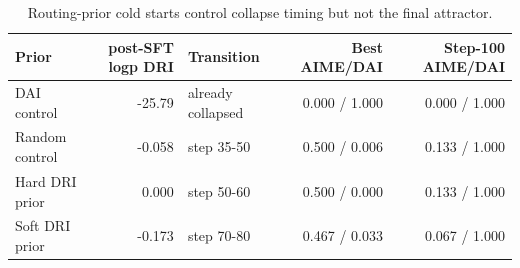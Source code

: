 \begin{table}[t]
\centering
\small
\caption{Routing-prior cold starts control collapse timing but not the final attractor.}
\label{tab:cold-start}
\begin{tabular}{lrlrr}
\toprule
Prior & post-SFT logp DRI & Transition & Best AIME/DAI & Step-100 AIME/DAI \\
\midrule
DAI control & -25.79 & already collapsed & 0.000 / 1.000 & 0.000 / 1.000 \\
Random control & -0.058 & step 35-50 & 0.500 / 0.006 & 0.133 / 1.000 \\
Hard DRI prior & 0.000 & step 50-60 & 0.500 / 0.000 & 0.133 / 1.000 \\
Soft DRI prior & -0.173 & step 70-80 & 0.467 / 0.033 & 0.067 / 1.000 \\
\bottomrule
\end{tabular}
\end{table}
